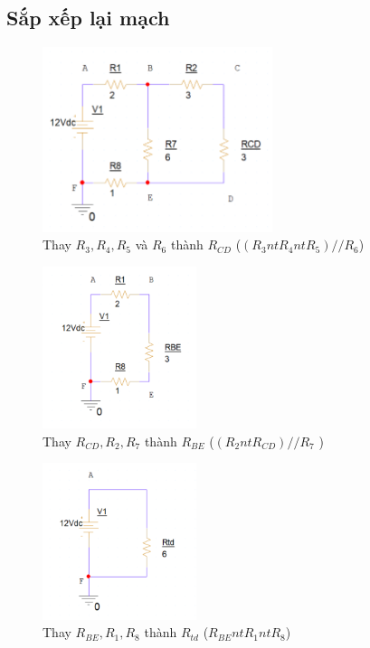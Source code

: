 \subsection{Sắp xếp lại mạch}
\begin{figure}[!htbp]
    \centering
    \includegraphics[width=0.6\textwidth]{graphics/ex2/f4.png}
    \caption{Thay \(R_3, R_4, R_5\) và \(R_6\) thành \(R_{CD}\) (\((R_3 nt R_4 nt R_5)//R_6\))}
\end{figure}    
\begin{figure}[!htbp]
    \centering
    \includegraphics[width=0.4\textwidth]{graphics/ex2/f5.png}
    \caption{Thay \(R_{CD}, R_2, R_7\) thành \(R_{BE}\) (\((R_2 nt R_{CD})// R_7\) )}
\end{figure}
\begin{figure}[!htbp]
    \centering
    \includegraphics[width=0.4\textwidth]{graphics/ex2/f3.png}
    \caption{Thay \(R_{BE}, R_1, R_8\) thành \(R_{td}\) (\(R_{BE} nt R_1 nt R_8\))}
\end{figure}
\newpage
